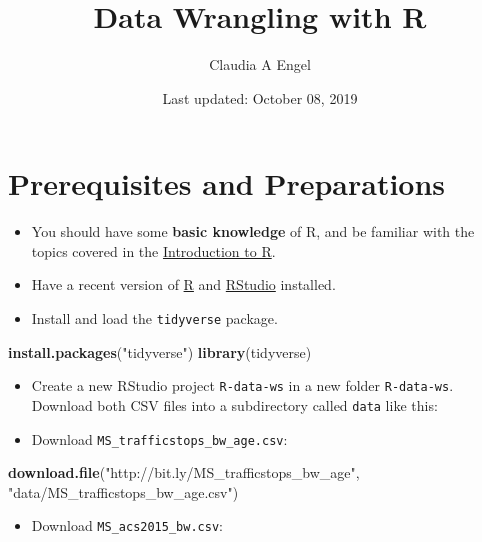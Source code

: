 \documentclass[]{book}
\title{Data Wrangling with R}
\author{Claudia A Engel}
\date{Last updated: October 08, 2019}
\newenvironment{Shaded}{\begin{snugshade}}{\end{snugshade}}
\newcommand{\KeywordTok}[1]{\textcolor[rgb]{0.13,0.29,0.53}{\textbf{#1}}}
\newcommand{\NormalTok}[1]{#1}
\newcommand{\StringTok}[1]{\textcolor[rgb]{0.31,0.60,0.02}{#1}}
\providecommand{\tightlist}{%
  \setlength{\itemsep}{0pt}\setlength{\parskip}{0pt}}
\begin{document}
\maketitle

{
\setcounter{tocdepth}{1}
\tableofcontents
}
\hypertarget{prerequisites-and-preparations}{%
\chapter*{Prerequisites and Preparations}\label{prerequisites-and-preparations}}

\begin{itemize}
\tightlist
\item
  You should have some \textbf{basic knowledge} of R, and be familiar with the topics covered in the \href{https://cengel.github.io/R-intro/}{Introduction to R}.
\item
  Have a recent version of \href{https://cran.r-project.org/}{R} and \href{https://www.rstudio.com/}{RStudio} installed.
\item
  Install and load the \texttt{tidyverse} package.
\end{itemize}

\begin{Shaded}
\begin{Highlighting}[]
\KeywordTok{install.packages}\NormalTok{(}\StringTok{"tidyverse"}\NormalTok{)  }
\KeywordTok{library}\NormalTok{(tidyverse)}
\end{Highlighting}
\end{Shaded}

\begin{itemize}
\tightlist
\item
  Create a new RStudio project \texttt{R-data-ws} in a new folder \texttt{R-data-ws}. Download both CSV files into a subdirectory called \texttt{data} like this:
\item
  Download \texttt{MS\_trafficstops\_bw\_age.csv}:
\end{itemize}

\begin{Shaded}
\begin{Highlighting}[]
\KeywordTok{download.file}\NormalTok{(}\StringTok{"http://bit.ly/MS_trafficstops_bw_age"}\NormalTok{,}
              \StringTok{"data/MS_trafficstops_bw_age.csv"}\NormalTok{)}
\end{Highlighting}
\end{Shaded}

\begin{itemize}
\tightlist
\item
  Download \texttt{MS\_acs2015\_bw.csv}:
\end{itemize}
\end{document}
